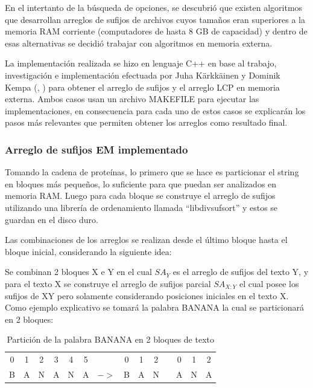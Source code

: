 En el intertanto de la búsqueda de opciones, se descubrió que existen algoritmos que desarrollan arreglos de sufijos de archivos cuyos tamaños eran superiores a la memoria RAM corriente (computadores de hasta 8 GB de capacidad) y dentro de esas alternativas se decidió trabajar con algoritmos en memoria externa.

La implementación realizada se hizo en lenguaje C++ en base al trabajo, investigación e implementación efectuada por Juha Kärkkäinen y Dominik Kempa (\cite{sascan}, \cite{emsparse}) para obtener el arreglo de sufijos y el arreglo LCP en memoria externa. Ambos casos usan un archivo MAKEFILE para ejecutar las implementaciones, en consecuencia para cada uno de estos casos se explicarán los pasos más relevantes que permiten obtener los arreglos como resultado final.

\subsubsection{Arreglo de sufijos EM implementado}

Tomando la cadena de proteínas, lo primero que se hace es particionar el string en bloques más pequeños, lo suficiente para que puedan ser analizados en memoria RAM. Luego para cada bloque se construye el arreglo de sufijos utilizando una librería de ordenamiento llamada ``libdivsufsort'' \cite{yutamori} y estos se guardan en el disco duro.

Las combinaciones de los arreglos se realizan desde el último bloque hasta el bloque inicial, considerando la siguiente idea:

Se combinan 2 bloques X e Y en el cual $SA_{Y}$ es el arreglo de sufijos del texto Y, y para el texto X se construye el arreglo de sufijos parcial $SA_{X:Y}$ el cual posee los sufijos de XY pero solamente considerando posiciones iniciales en el texto X. Como ejemplo explicativo se tomará la palabra BANANA la cual se particionará en 2 bloques:

\begin{table}[h]
\centering
\begin{tabular}{cccccccccccccc}
0                       & 1                      & 2                      & 3                      & 4                      & 5                      &                                    & 0                      & 1                      & 2                      &                       & 0                      & 1                      & 2                      \\ \cline{1-6} \cline{8-10} \cline{12-14} 
\multicolumn{1}{|c|}{B} & \multicolumn{1}{c|}{A} & \multicolumn{1}{c|}{N} & \multicolumn{1}{c|}{A} & \multicolumn{1}{c|}{N} & \multicolumn{1}{c|}{A} & \multicolumn{1}{c|}{$->$} & \multicolumn{1}{c|}{B} & \multicolumn{1}{c|}{A} & \multicolumn{1}{c|}{N} & \multicolumn{1}{c|}{} & \multicolumn{1}{c|}{A} & \multicolumn{1}{c|}{N} & \multicolumn{1}{c|}{A} \\ \cline{1-6} \cline{8-10} \cline{12-14} 
\end{tabular}
\caption{Partición de la palabra BANANA en 2 bloques de texto}
\end{table}

